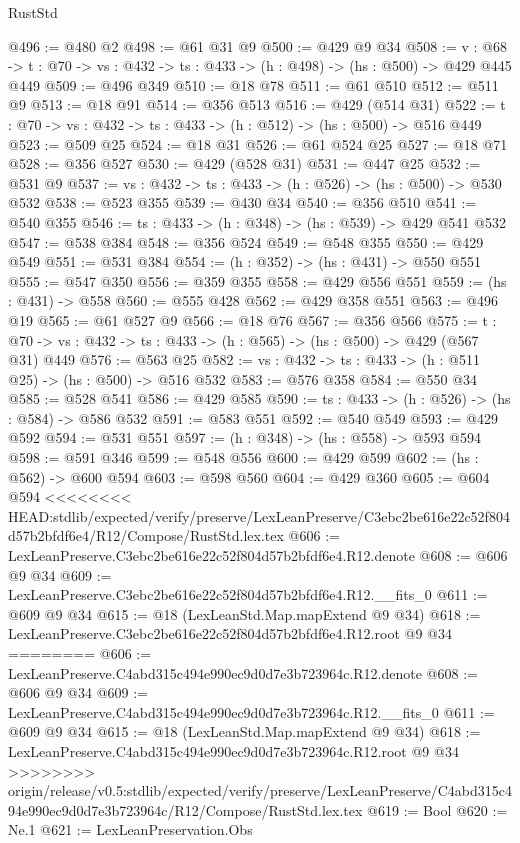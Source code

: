 \begin{lexlean}{RustStd}
\begin{coremodule}
{\begin{coremodule}
@496 := @480 @2
@498 := @61 @31 @9
@500 := @429 @9 @34
@508 := {v : @68} ->
  {t : @70} -> {vs : @432} -> {ts : @433} -> (h : @498) -> (hs : @500) -> @429 @445 @449
@509 := @496 @349
@510 := @18 @78
@511 := @61 @510
@512 := @511 @9
@513 := @18 @91
@514 := @356 @513
@516 := @429 (@514 @31)
@522 := {t : @70} -> {vs : @432} -> {ts : @433} -> (h : @512) -> (hs : @500) -> @516 @449
@523 := @509 @25
@524 := @18 @31
@526 := @61 @524 @25
@527 := @18 @71
@528 := @356 @527
@530 := @429 (@528 @31)
@531 := @447 @25
@532 := @531 @9
@537 := {vs : @432} -> {ts : @433} -> (h : @526) -> (hs : @500) -> @530 @532
@538 := @523 @355
@539 := @430 @34
@540 := @356 @510
@541 := @540 @355
@546 := {ts : @433} -> (h : @348) -> (hs : @539) -> @429 @541 @532
@547 := @538 @384
@548 := @356 @524
@549 := @548 @355
@550 := @429 @549
@551 := @531 @384
@554 := (h : @352) -> (hs : @431) -> @550 @551
@555 := @547 @350
@556 := @359 @355
@558 := @429 @556 @551
@559 := (hs : @431) -> @558
@560 := @555 @428
@562 := @429 @358 @551
@563 := @496 @19
@565 := @61 @527 @9
@566 := @18 @76
@567 := @356 @566
@575 := {t : @70} -> {vs : @432} -> {ts : @433} -> (h : @565) -> (hs : @500) -> @429 (@567 @31) @449
@576 := @563 @25
@582 := {vs : @432} -> {ts : @433} -> (h : @511 @25) -> (hs : @500) -> @516 @532
@583 := @576 @358
@584 := @550 @34
@585 := @528 @541
@586 := @429 @585
@590 := {ts : @433} -> (h : @526) -> (hs : @584) -> @586 @532
@591 := @583 @551
@592 := @540 @549
@593 := @429 @592
@594 := @531 @551
@597 := (h : @348) -> (hs : @558) -> @593 @594
@598 := @591 @346
@599 := @548 @556
@600 := @429 @599
@602 := (hs : @562) -> @600 @594
@603 := @598 @560
@604 := @429 @360
@605 := @604 @594
<<<<<<<< HEAD:stdlib/expected/verify/preserve/LexLeanPreserve/C3ebc2be616e22c52f804d57b2bfdf6e4/R12/Compose/RustStd.lex.tex
@606 := LexLeanPreserve.C3ebc2be616e22c52f804d57b2bfdf6e4.R12.denote
@608 := @606 @9 @34
@609 := LexLeanPreserve.C3ebc2be616e22c52f804d57b2bfdf6e4.R12.__fits_0
@611 := @609 @9 @34
@615 := @18 (LexLeanStd.Map.mapExtend @9 @34)
@618 := LexLeanPreserve.C3ebc2be616e22c52f804d57b2bfdf6e4.R12.root @9 @34
========
@606 := LexLeanPreserve.C4abd315c494e990ec9d0d7e3b723964c.R12.denote
@608 := @606 @9 @34
@609 := LexLeanPreserve.C4abd315c494e990ec9d0d7e3b723964c.R12.__fits_0
@611 := @609 @9 @34
@615 := @18 (LexLeanStd.Map.mapExtend @9 @34)
@618 := LexLeanPreserve.C4abd315c494e990ec9d0d7e3b723964c.R12.root @9 @34
>>>>>>>> origin/release/v0.5:stdlib/expected/verify/preserve/LexLeanPreserve/C4abd315c494e990ec9d0d7e3b723964c/R12/Compose/RustStd.lex.tex
@619 := Bool
@620 := Ne.{1}
@621 := LexLeanPreservation.Obs

\end{coremodule}}
\end{coremodule}
\end{lexlean}
